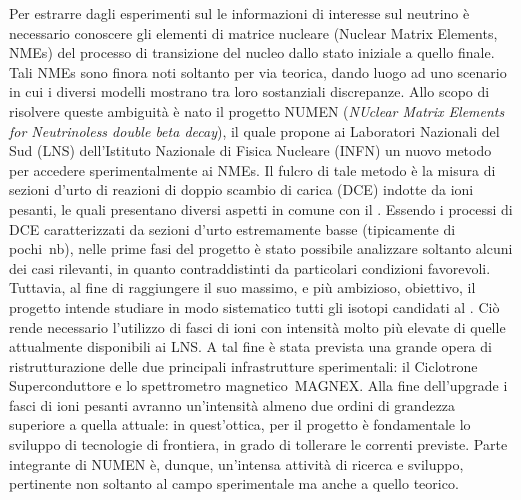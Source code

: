 Per estrarre dagli esperimenti sul \doppiobeta{} le informazioni di interesse sul neutrino è necessario conoscere gli elementi di matrice nucleare (Nuclear Matrix Elements, NMEs) del processo di transizione del nucleo dallo stato iniziale a quello finale. 
Tali NMEs sono finora noti soltanto per via teorica, dando luogo ad uno scenario in cui i diversi modelli mostrano tra loro sostanziali discrepanze.
Allo scopo di risolvere queste ambiguità è nato il progetto NUMEN (\emph{NUclear Matrix Elements for Neutrinoless double beta decay}), il quale propone ai Laboratori Nazionali del Sud (LNS) dell'Istituto Nazionale di Fisica Nucleare (INFN) un nuovo metodo per accedere sperimentalmente ai NMEs.
Il fulcro di tale metodo è la misura di sezioni d'urto di reazioni di doppio scambio di carica (DCE) indotte da ioni pesanti, le quali presentano diversi aspetti in comune con il \doppiobeta.
Essendo i processi di DCE caratterizzati da sezioni d'urto estremamente basse (tipicamente di pochi~nb), nelle prime fasi del progetto è stato possibile analizzare soltanto alcuni dei casi rilevanti, in quanto contraddistinti da particolari condizioni favorevoli.
Tuttavia, al fine di raggiungere il suo massimo, e più ambizioso, obiettivo, il progetto intende studiare in modo sistematico tutti gli isotopi candidati al \doppiobeta{}.
Ciò rende necessario l'utilizzo di fasci di ioni con intensità molto più elevate di quelle attualmente disponibili ai LNS.
A tal fine è stata prevista una grande opera di ristrutturazione delle due principali infrastrutture sperimentali: il Ciclotrone Superconduttore e lo spettrometro magnetico~MAGNEX.
Alla fine dell'upgrade i fasci di ioni pesanti avranno un'intensità almeno due ordini di grandezza superiore a quella attuale: in quest'ottica, per il progetto è fondamentale lo sviluppo di tecnologie di frontiera, in grado di tollerare le correnti previste.
Parte integrante di NUMEN è, dunque, un'intensa attività di ricerca e sviluppo, pertinente non soltanto al campo sperimentale ma anche a quello teorico.


